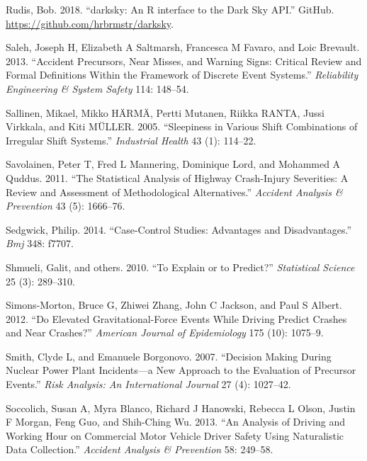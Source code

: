 \documentclass[12pt]{book}
\numberwithin{equation}{chapter}
\begin{document}
\leavevmode\hypertarget{ref-hrbrmstr}{}%
Rudis, Bob. 2018. ``darksky: An R interface to the Dark Sky API.'' GitHub. \url{https://github.com/hrbrmstr/darksky}.

\leavevmode\hypertarget{ref-saleh2013accident}{}%
Saleh, Joseph H, Elizabeth A Saltmarsh, Francesca M Favaro, and Loic Brevault. 2013. ``Accident Precursors, Near Misses, and Warning Signs: Critical Review and Formal Definitions Within the Framework of Discrete Event Systems.'' \emph{Reliability Engineering \& System Safety} 114: 148--54.

\leavevmode\hypertarget{ref-sallinen2005sleepiness}{}%
Sallinen, Mikael, Mikko HÄRMÄ, Pertti Mutanen, Riikka RANTA, Jussi Virkkala, and Kiti MÜLLER. 2005. ``Sleepiness in Various Shift Combinations of Irregular Shift Systems.'' \emph{Industrial Health} 43 (1): 114--22.

\leavevmode\hypertarget{ref-savolainen2011statistical}{}%
Savolainen, Peter T, Fred L Mannering, Dominique Lord, and Mohammed A Quddus. 2011. ``The Statistical Analysis of Highway Crash-Injury Severities: A Review and Assessment of Methodological Alternatives.'' \emph{Accident Analysis \& Prevention} 43 (5): 1666--76.

\leavevmode\hypertarget{ref-sedgwick2014case}{}%
Sedgwick, Philip. 2014. ``Case-Control Studies: Advantages and Disadvantages.'' \emph{Bmj} 348: f7707.

\leavevmode\hypertarget{ref-shmueli2010explain}{}%
Shmueli, Galit, and others. 2010. ``To Explain or to Predict?'' \emph{Statistical Science} 25 (3): 289--310.

\leavevmode\hypertarget{ref-simons2012elevated}{}%
Simons-Morton, Bruce G, Zhiwei Zhang, John C Jackson, and Paul S Albert. 2012. ``Do Elevated Gravitational-Force Events While Driving Predict Crashes and Near Crashes?'' \emph{American Journal of Epidemiology} 175 (10): 1075--9.

\leavevmode\hypertarget{ref-smith2007decision}{}%
Smith, Clyde L, and Emanuele Borgonovo. 2007. ``Decision Making During Nuclear Power Plant Incidents---a New Approach to the Evaluation of Precursor Events.'' \emph{Risk Analysis: An International Journal} 27 (4): 1027--42.

\leavevmode\hypertarget{ref-soccolich2013analysis}{}%
Soccolich, Susan A, Myra Blanco, Richard J Hanowski, Rebecca L Olson, Justin F Morgan, Feng Guo, and Shih-Ching Wu. 2013. ``An Analysis of Driving and Working Hour on Commercial Motor Vehicle Driver Safety Using Naturalistic Data Collection.'' \emph{Accident Analysis \& Prevention} 58: 249--58.
\end{document}
